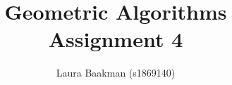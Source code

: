 \documentclass[a4paper]{article}
\title{Geometric Algorithms\\Assignment 4}
\author{Laura Baakman (s1869140)}
\begin{document}
\maketitle

\section{~}
\label{s:a}


\section{~}
\label{s:b}


\section{~}
\label{s:c}

\end{document}
